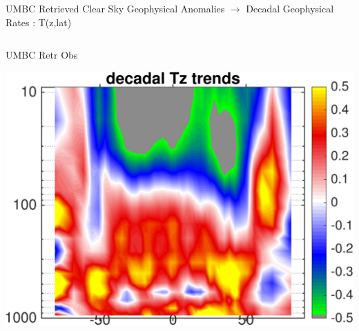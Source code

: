 \documentclass[10pt,t]{beamer}
\begin{document}
\begin{frame}{UMBC Retrieved Clear Sky Geophysical Anomalies $\rightarrow$ Decadal Geophysical Rates : T(z,lat)}
\begin{columns}
\begin{column}{0.45\columnwidth}
\begin{block}{\footnotesize UMBC Retr Obs}
\vspace{-0.1in}
\begin{center}
\includegraphics[width=\linewidth]{Figs/ClearAnom/umbc_clr_retr_obs_wv_rate_200209_201808.png}
\end{center}
\end{block}
\end{column}


\end{columns}
\end{frame}
\end{document}

